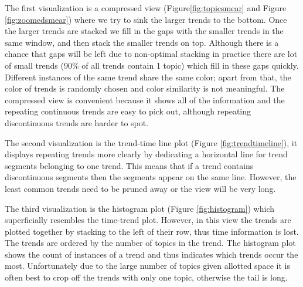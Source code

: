 \documentclass[times, 10pt,twocolumn]{article}
\begin{document}
The first visualization is a compressed view
(Figure\ref{fig:topicsmear} and Figure \ref{fig:zoomedsmear}) where we
try to sink the larger trends to the bottom.  Once the larger trends
are stacked we fill in the gaps with the smaller trends in the same
window, and then stack the smaller trends on top.  Although there is a
chance that gaps will be left due to non-optimal stacking in practice
there are lot of small trends (90\% of all trends contain 1 topic)
which fill in these gaps quickly.  Different instances of the same
trend share the same color; apart from that, the color of trends is
randomly chosen and color similarity is not meaningful.  The
compressed view is convenient because it shows all of the information
and the repeating continuous trends are easy to pick out, although
repeating discontinuous trends are harder to spot.

The second visualization is the trend-time line plot (Figure
\ref{fig:trendtimeline}), it displays repeating trends more clearly by
dedicating a horizontal line for trend segments belonging to one
trend. This means that if a trend contains discontinuous segments then
the segments appear on the same line.  However, the least common
trends need to be pruned away or the view will be very long.

The third visualization is the histogram plot (Figure
\ref{fig:histogram}) which superficially resembles the time-trend
plot.  However, in this view the trends are plotted together by
stacking to the left of their row, thus time information is lost.  The
trends are ordered by the number of topics in the trend.  The
histogram plot shows the count of instances of a trend and thus
indicates which trends occur the most. Unfortunately due to the large
number of topics given allotted space it is often best to crop off the
trends with only one topic, otherwise the tail is long.
\end{document}
